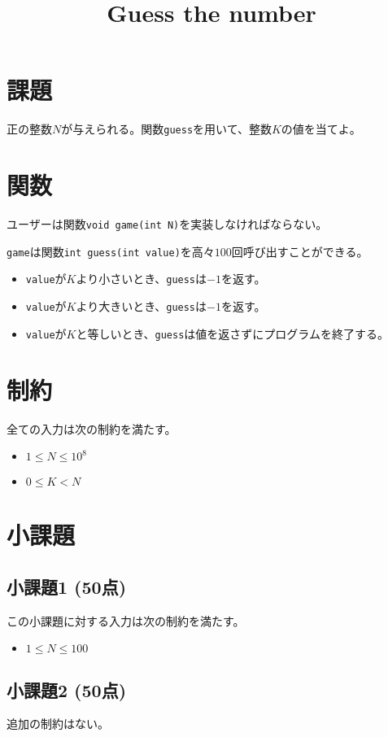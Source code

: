 \documentclass[10pt,a4j,notitlepage,uplatex]{jsarticle}
\title{Guess the number}
\begin{document}
\section{課題}

正の整数$N$が与えられる。関数\texttt{guess}を用いて、整数$K$の値を当てよ。

\section{関数}

ユーザーは関数\texttt{void game(int N)}を実装しなければならない。

\texttt{game}は関数\texttt{int guess(int value)}を高々$100$回呼び出すことができる。

\begin{itemize}
  \item \texttt{value}が$K$より小さいとき、\texttt{guess}は$-1$を返す。
  \item \texttt{value}が$K$より大きいとき、\texttt{guess}は$-1$を返す。
  \item \texttt{value}が$K$と等しいとき、\texttt{guess}は値を返さずにプログラムを終了する。
\end{itemize}

\section{制約}

全ての入力は次の制約を満たす。
\begin{itemize}
  \item $1 \leq N \leq 10^{8}$
  \item $0 \leq K < N$
\end{itemize}

\section{小課題}

\subsection{小課題1 (50点)}

この小課題に対する入力は次の制約を満たす。
\begin{itemize}
  \item $1 \leq N \leq 100$
\end{itemize}

\subsection{小課題2 (50点)}

追加の制約はない。
\end{document}
